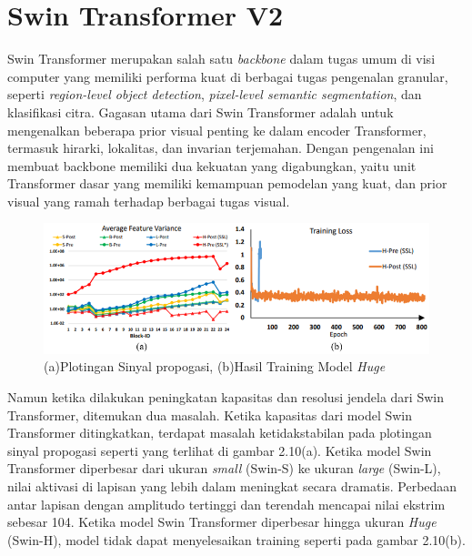 \section{Swin Transformer V2}
\label{sec:swintransformerv2}

Swin Transformer merupakan salah satu \emph{backbone} dalam tugas umum di visi computer yang memiliki performa kuat di berbagai tugas pengenalan granular, seperti \emph{region-level object detection}, 
\emph{pixel-level semantic segmentation}, dan klasifikasi citra. Gagasan utama dari Swin Transformer adalah untuk mengenalkan beberapa prior visual penting ke dalam encoder Transformer, termasuk hirarki, 
lokalitas, dan invarian terjemahan. Dengan pengenalan ini membuat backbone memiliki dua kekuatan yang digabungkan, yaitu unit Transformer dasar yang memiliki kemampuan pemodelan yang kuat, dan prior 
visual yang ramah terhadap berbagai tugas visual.\parencite{Liuv22021}

\begin{figure}[ht]
  \centering
  \includegraphics[scale=0.9]{gambar/Issue Swin V1.png}
  \caption{(a)Plotingan Sinyal propogasi, (b)Hasil Training Model \emph{Huge}}
  \label{fig:plotingansinyalpropogasidanperbedaanhasiltrainingmodelhuge}
\end{figure}

Namun ketika dilakukan peningkatan kapasitas dan resolusi jendela dari Swin \linebreak Transformer, ditemukan dua masalah. Ketika kapasitas dari model Swin Transformer ditingkatkan, terdapat masalah ketidakstabilan 
pada plotingan sinyal propogasi seperti yang terlihat di gambar 2.10(a). Ketika model Swin Transformer diperbesar dari ukuran \emph{small} (Swin-S) ke ukuran \emph{large} (Swin-L), nilai aktivasi di lapisan 
yang lebih dalam meningkat secara dramatis. Perbedaan antar lapisan dengan amplitudo tertinggi dan terendah mencapai nilai ekstrim sebesar 104. Ketika model Swin Transformer diperbesar hingga ukuran 
\emph{Huge} (Swin-H), model tidak dapat menyelesaikan training seperti pada gambar 2.10(b).\parencite{Liuv22021}

